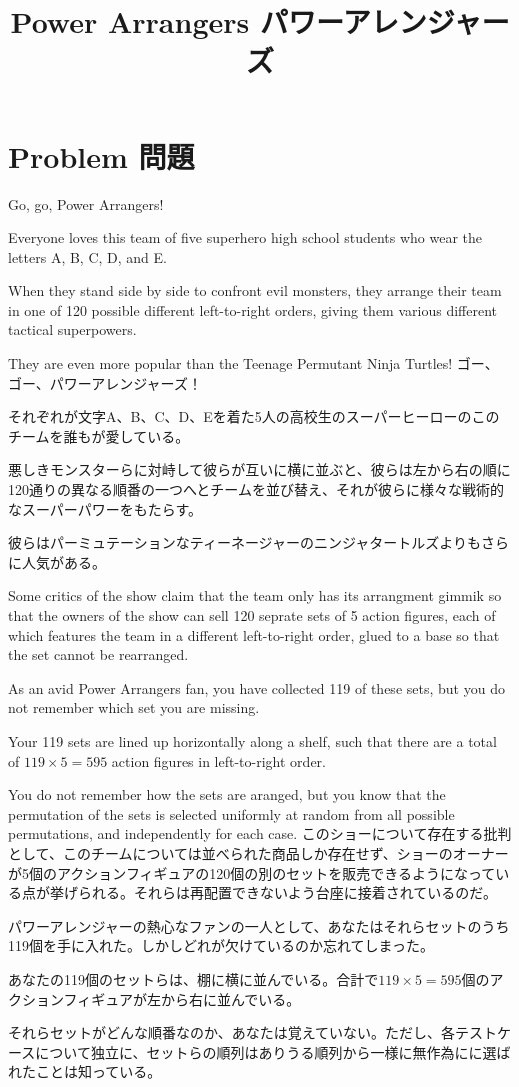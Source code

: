 \documentclass[uplatex,dvipdfmx]{jsarticle} \usepackage{amsmath,amssymb,bm}
\title{Power Arrangers パワーアレンジャーズ} \author{} \date{}
\begin{document}
\maketitle
\section*{Problem 問題}
\begin{paracol}{2}
Go, go, Power Arrangers!

Everyone loves this team of five superhero high school students who wear the letters A, B, C, D, and E.

When they stand side by side to confront evil monsters, they arrange their team in one of 120 possible different left-to-right orders, giving them various different tactical superpowers.

They are even more popular than the Teenage Permutant Ninja Turtles!
\switchcolumn
ゴー、ゴー、パワーアレンジャーズ！

それぞれが文字A、B、C、D、Eを着た5人の高校生のスーパーヒーローのこのチームを誰もが愛している。

悪しきモンスターらに対峙して彼らが互いに横に並ぶと、彼らは左から右の順に120通りの異なる順番の一つへとチームを並び替え、それが彼らに様々な戦術的なスーパーパワーをもたらす。

彼らはパーミュテーションなティーネージャーのニンジャタートルズよりもさらに人気がある。
\end{paracol}
\vspace{\baselineskip}
\begin{paracol}{2}
Some critics of the show claim that the team only has its arrangment gimmik so that the owners of the show can sell 120 seprate sets of 5 action figures, each of which features the team in a different left-to-right order, glued to a base so that the set cannot be rearranged.

As an avid Power Arrangers fan, you have collected 119 of these sets, but you do not remember which set you are missing.

Your 119 sets are lined up horizontally along a shelf, such that there are a total of $119\times 5=595$ action figures in left-to-right order.

You do not remember how the sets are aranged, but you know that the permutation of the sets is selected uniformly at random from all possible permutations, and independently for each case.
\switchcolumn
このショーについて存在する批判として、このチームについては並べられた商品しか存在せず、ショーのオーナーが5個のアクションフィギュアの120個の別のセットを販売できるようになっている点が挙げられる。それらは再配置できないよう台座に接着されているのだ。

パワーアレンジャーの熱心なファンの一人として、あなたはそれらセットのうち119個を手に入れた。しかしどれが欠けているのか忘れてしまった。

あなたの119個のセットらは、棚に横に並んでいる。合計で$119\times 5=595$個のアクションフィギュアが左から右に並んでいる。

それらセットがどんな順番なのか、あなたは覚えていない。ただし、各テストケースについて独立に、セットらの順列はありうる順列から一様に無作為にに選ばれたことは知っている。
\end{paracol}
\end{document}
